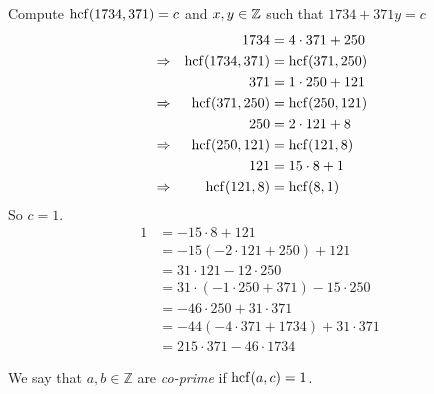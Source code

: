 \begin{ex}
Compute $\operatorname{hcf}(1734,371)=c$ and $x,y \in \mathbb Z$ such that $1734+371y=c$
\begin{align*}
& & 1734 & = 4\cdot 371 + 250 \\
& \Rightarrow & \operatorname{hcf}(1734,371) & = \operatorname{hcf}(371,250) \\
& & 371 & = 1 \cdot 250 +121 \\
& \Rightarrow & \operatorname{hcf}(371,250) & = \operatorname{hcf}(250,121) \\
& & 250 & = 2 \cdot 121 +8 \\
& \Rightarrow & \operatorname{hcf}(250,121) & = \operatorname{hcf}(121,8) \\
& & 121 & = 15 \cdot 8 +1 \\
& \Rightarrow & \operatorname{hcf}(121,8) & = \operatorname{hcf}(8,1)
\end{align*}
So $c=1$. 
\begin{align*}
1 & =-15 \cdot 8 +121 \\
& = -15 (-2 \cdot 121 +250 ) +121 \\
& =31 \cdot 121 - 12 \cdot 250 \\
& = 31 \cdot ( -1 \cdot 250 + 371) -15 \cdot 250 \\
&= -46 \cdot 250 +31\cdot 371 \\
& = -44(-4 \cdot 371 + 1734) +31 \cdot 371 \\
& = 215\cdot 371-46 \cdot 1734
\end{align*}
\end{ex}

\begin{df}
We say that $a,b \in \mathbb Z$ are \emph{co-prime} if $\operatorname{hcf}(a,c) = 1$.
\end{df}



